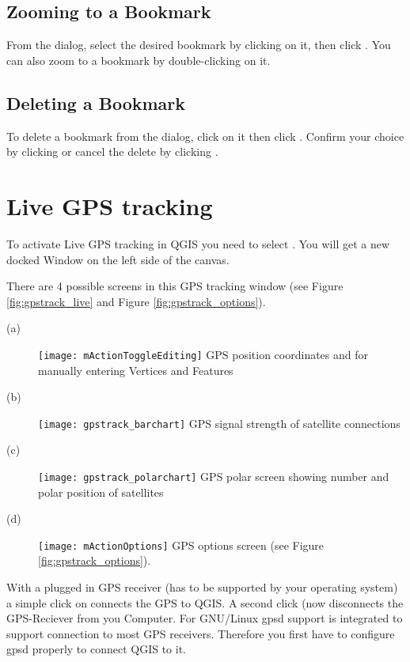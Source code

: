 \subsection{Zooming to a Bookmark}
From the  dialog, select the desired bookmark by clicking on it,
then click .
You can also zoom to a bookmark by double-clicking on it.

\subsection{Deleting a Bookmark}
To delete a bookmark from the 
dialog, click on it then click .
Confirm your choice by clicking  or cancel the
delete by clicking .

\section{Live GPS tracking}\label{sec:gpstracking}

To activate Live GPS tracking in QGIS you need to select
 \arrow {}. You will get a new
docked Window on the left side of the canvas.

There are 4 possible screens in this GPS tracking window
(see Figure \ref{fig:gpstrack_live} and Figure \ref{fig:gpstrack_options}).

\begin{description}
 \item[(a)] \texttt{[image: mActionToggleEditing]}
GPS position coordinates and for manually entering Vertices and Features
 \item[(b)] \texttt{[image: gpstrack\_barchart]}
GPS signal strength of satellite connections
 \item[(c)] \texttt{[image: gpstrack\_polarchart]}
GPS polar screen showing number and polar position of satellites
 \item[(d)] \texttt{[image: mActionOptions]}
GPS options screen (see Figure \ref{fig:gpstrack_options}).
\end{description}

With a plugged in GPS receiver (has to be supported by your operating system)
a simple click on  connects the GPS to QGIS. A second click
(now  disconnects the GPS-Reciever from you Computer. For 
GNU/Linux gpsd support is integrated to support connection to most GPS 
receivers. Therefore you first have to configure gpsd properly to connect QGIS to it.

